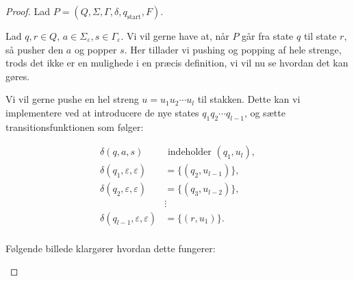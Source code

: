 \begin{proof}
  Lad $P = (Q, \Sigma, \Gamma, \delta, q_{\text{start}}, F)$.

  Lad $q, r \in Q$, $a \in \Sigma_{\varepsilon}, s \in \Gamma_{\varepsilon}$. Vi vil gerne have at, når $P$ går fra state $q$ til state $r$, så pusher den $a$ og popper $s$. Her tillader vi pushing og popping af hele strenge, trods det ikke er en mulighede i en præcis definition, vi vil nu se hvordan det kan gøres.

  Vi vil gerne pushe en hel streng $u = u_{1}u_{2} \cdots u_{l}$ til stakken. Dette kan vi implementere ved at introducere de nye states $q_{1} q_{2} \cdots q_{l-1}$, og sætte transitionsfunktionen som følger:

  \begin{equation*}
    \begin{split}
      \delta (q,a,s) &\text{ indeholder } (q_{1}, u_{l}), \\
      \delta (q_{1}, \varepsilon, \varepsilon) &= \{(q_{2}, u_{l-1})\}, \\
      \delta (q_{2}, \varepsilon, \varepsilon) &= \{(q_{3}, u_{l-2})\}, \\
                       &\vdots \\
      \delta (q_{l-1}, \varepsilon, \varepsilon) &= \{(r, u_{1})\}.\\
    \end{split}
  \end{equation*}

    Følgende billede klargører hvordan dette fungerer:

    \begin{center}

    \end{center}


\end{proof}
